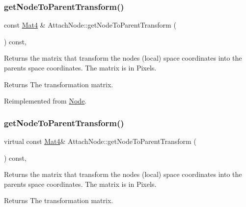 \subsubsection{\texorpdfstring{get\+Node\+To\+Parent\+Transform()}{getNodeToParentTransform()}\hspace{0.1cm}{\footnotesize\ttfamily [1/2]}}
{\footnotesize\ttfamily const \hyperlink{classMat4}{Mat4} \& Attach\+Node\+::get\+Node\+To\+Parent\+Transform (\begin{DoxyParamCaption}{ }\end{DoxyParamCaption}) const\hspace{0.3cm}{\ttfamily [override]}, {\ttfamily [virtual]}}

Returns the matrix that transform the node\textquotesingle{}s (local) space coordinates into the parent\textquotesingle{}s space coordinates. The matrix is in Pixels.

\begin{DoxyReturn}{Returns}
The transformation matrix. 
\end{DoxyReturn}


Reimplemented from \hyperlink{classNode_a7235b4a4d449fb7e01459c5c3b24d1eb}{Node}.

\mbox{\label{classAttachNode_a0b751dd5e5c67cada4ab1e27f67f8a71}} 
\subsubsection{\texorpdfstring{get\+Node\+To\+Parent\+Transform()}{getNodeToParentTransform()}\hspace{0.1cm}{\footnotesize\ttfamily [2/2]}}
{\footnotesize\ttfamily virtual const \hyperlink{classMat4}{Mat4}\& Attach\+Node\+::get\+Node\+To\+Parent\+Transform (\begin{DoxyParamCaption}{ }\end{DoxyParamCaption}) const\hspace{0.3cm}{\ttfamily [override]}, {\ttfamily [virtual]}}

Returns the matrix that transform the node\textquotesingle{}s (local) space coordinates into the parent\textquotesingle{}s space coordinates. The matrix is in Pixels.

\begin{DoxyReturn}{Returns}
The transformation matrix. 
\end{DoxyReturn}


